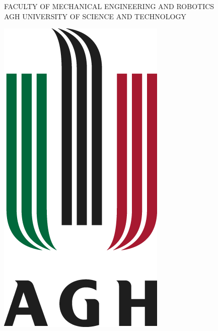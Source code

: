 \documentclass{article}
\begin{document}
\begin{titlepage}
    \begin{center}
        
	\begin{figure}
		\centering
        FACULTY OF MECHANICAL ENGINEERING AND ROBOTICS\\
        AGH UNIVERSITY OF SCIENCE AND TECHNOLOGY\\
        \vspace{0.2cm}
    	\begin{minipage}[b]{0.4\textwidth}
    	    \centering
    		\includegraphics[width=\textwidth]{IMG/AGH.png}

\end{minipage}
\end{figure}
\end{center}
\end{titlepage}
\end{document}
